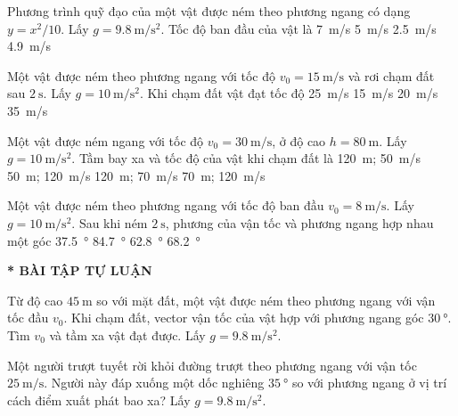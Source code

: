 \begin{ex}
	Phương trình quỹ đạo của một vật được ném theo phương ngang có dạng $y=x^2/10$. Lấy $g=\SI{9.8}{\meter/\second^2}$. Tốc độ ban đầu của vật là 
	\choice
	{\SI{7}{\meter/\second}}
	{\SI{5}{\meter/\second}}
	{\SI{2.5}{\meter/\second}}
	{\SI{4.9}{\meter/\second}}
	\loigiai{}
\end{ex}
\begin{ex}
	Một vật được ném theo phương ngang với tốc độ $v_0=\SI{15}{\meter/\second}$ và rơi chạm đất sau $\SI{2}{\second}$. Lấy $g=\SI{10}{\meter/\second^2}$. Khi chạm đất vật đạt tốc độ
	\choice
	{\SI{25}{\meter/\second}}
	{\SI{15}{\meter/\second}}
	{\SI{20}{\meter/\second}}
	{\SI{35}{\meter/\second}}
	\loigiai{}
\end{ex}
\begin{ex}
	Một vật được ném ngang với tốc độ $v_0=\SI{30}{\meter/\second}$, ở độ cao $h=\SI{80}{\meter}$. Lấy $g=\SI{10}{\meter/\second^2}$. Tầm bay xa và tốc độ của vật khi chạm đất là	
	\choice
	{\SI{120}{\meter}; \SI{50}{\meter/\second}}
	{\SI{50}{\meter}; \SI{120}{\meter/\second}}
	{\SI{120}{\meter}; \SI{70}{\meter/\second}}
	{\SI{70}{\meter}; \SI{120}{\meter/\second}}
	\loigiai{}
\end{ex}
\begin{ex}
	Một vật được ném theo phương ngang với tốc độ ban đầu $v_0=\SI{8}{\meter/\second}$. Lấy $g=\SI{10}{\meter/\second^2}$. Sau khi ném $\SI{2}{\second}$, phương của vận tốc và phương ngang hợp nhau một góc 	
	\choice
	{\SI{37.5}{\degree}}
	{\SI{84.7}{\degree}}
	{\SI{62.8}{\degree}}
	{\SI{68.2}{\degree}}
	\loigiai{}
\end{ex}
\textbf{* BÀI TẬP TỰ LUẬN}
\setcounter{ex}{0}
\begin{ex}
	Từ độ cao $\SI{45}{\meter}$ so với mặt đất, một vật được ném theo phương ngang với vận tốc đầu $v_0$. Khi chạm đất, vector vận tốc của vật hợp với phương ngang góc $\SI{30}{\degree}$. Tìm $v_0$ và tầm xa vật đạt được. Lấy $g=\SI{9.8}{\meter/\second^2}$.
\end{ex}
\begin{ex}
	Một người trượt tuyết rời khỏi đường trượt theo phương ngang với vận tốc $\SI{25}{\meter/\second}$. Người này đáp xuống một dốc nghiêng $\SI{35}{\degree}$ so với phương ngang ở vị trí cách điểm xuất phát bao xa? Lấy $g=\SI{9.8}{\meter/\second^2}$.
\end{ex}
